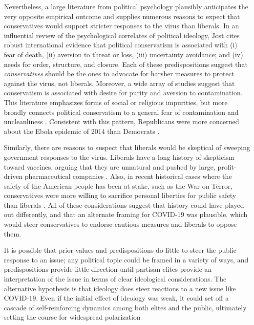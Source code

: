 \documentclass{article}
\begin{document}
Nevertheless, a large literature from political psychology plausibly
anticipates the very opposite empirical outcome and supplies numerous
reasons to expect that conservatives would support stricter responses to
the virus than liberals. In an influential review of the psychological
correlates of political ideology, Jost
\parencite{Jost2006-wm} cites robust
international evidence that political conservatism is associated with
(i) fear of death, (ii) aversion to threat or loss, (iii) uncertainty
avoidance; and (iv) needs for order, structure, and closure. Each of
these predispositions suggest that \emph{conservatives} should be the
ones to advocate for harsher measures to protect against the virus, not
liberals. Moreover, a wide array of studies suggest that conservatism is
associated with desire for purity and aversion to contamination. This
literature emphasizes forms of social or religious impurities, but more
broadly connects political conservatism to a general fear of
contamination and uncleanliness
\parencite{Haidt2012-fy, Helzer2011-ni, Jost2017-sj, Oxley2008-pi, Terrizzi2013-po}. Consistent with this pattern, Republicans
were more concerned about the Ebola epidemic of 2014 than Democrats
\parencite{Pew_Research_Center2014-gi}.

Similarly, there are reasons to suspect that liberals would be skeptical
of sweeping government responses to the virus. Liberals have a long
history of skepticism toward vaccines, arguing that they are unnatural
and pushed by large, profit-driven pharmaceutical companies
\parencite{Callaghan2019-zh, Colgrove2006-jy, Conis2014-qi, Jamison2019-yo}. Also, in recent historical cases where the safety of the
American people has been at stake, such as the War on Terror,
conservatives were more willing to sacrifice personal liberties for
public safety than liberals
\parencite{Rosentiel2011-pi}. All of
these considerations suggest that history could have played out
differently, and that an alternate framing for COVID-19 was plausible,
which would steer conservatives to endorse cautious measures and
liberals to oppose them.

It is possible that prior values and predispositions do little to steer
the public response to an issue; any political topic could be framed in
a variety of ways, and predispositions provide little direction until
partisan elites provide an interpretation of the issue in terms of clear
ideological considerations. The alternative hypothesis is that ideology
does steer reactions to a new issue like COVID-19. Even if the initial
effect of ideology was weak, it could set off a cascade of
self-reinforcing dynamics among both elites and the public, ultimately
setting the course for widespread polarization
\parencite{DellaPosta2020-ta, Rawlings2022-pw}
\end{document}
